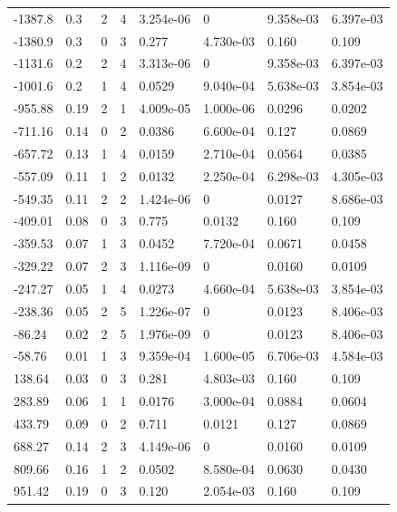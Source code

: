 \documentclass[preview]{standalone}
\begin{document}
{{\begin{tabular}{L{1.2cm}C{1.2cm} C{0.3cm}C{0.5cm} C{1.4cm}C{1.4cm} C{1.4cm}C{1.4cm}}
  -1387.8  &   0.3  & 2     &  4 &  3.254e-06  & 0  & 9.358e-03 &  6.397e-03   \\ 
  -1380.9  &   0.3  & 0     &  3 &  0.277  & 4.730e-03  & 0.160 &  0.109   \\ 
  -1131.6  &   0.2  & 2     &  4 &  3.313e-06  & 0  & 9.358e-03 &  6.397e-03   \\ 
  -1001.6  &   0.2  & 1     &  4 &  0.0529  & 9.040e-04  & 5.638e-03 &  3.854e-03   \\ 
  -955.88  &  0.19  & 2     &  1 &  4.009e-05  & 1.000e-06  & 0.0296 &  0.0202   \\ 
  -711.16  &  0.14  & 0     &  2 &  0.0386  & 6.600e-04  & 0.127 &  0.0869   \\ 
  -657.72  &  0.13  & 1     &  4 &  0.0159  & 2.710e-04  & 0.0564 &  0.0385   \\ 
  -557.09  &  0.11  & 1     &  2 &  0.0132  & 2.250e-04  & 6.298e-03 &  4.305e-03   \\ 
  -549.35  &  0.11  & 2     &  2 &  1.424e-06  & 0  & 0.0127 &  8.686e-03   \\ 
  -409.01  &  0.08  & 0     &  3 &  0.775  & 0.0132  & 0.160 &  0.109   \\ 
  -359.53  &  0.07  & 1     &  3 &  0.0452  & 7.720e-04  & 0.0671 &  0.0458   \\ 
  -329.22  &  0.07  & 2     &  3 &  1.116e-09  & 0  & 0.0160 &  0.0109   \\ 
  -247.27  &  0.05  & 1     &  4 &  0.0273  & 4.660e-04  & 5.638e-03 &  3.854e-03   \\ 
  -238.36  &  0.05  & 2     &  5 &  1.226e-07  & 0  & 0.0123 &  8.406e-03   \\ 
  -86.24  &  0.02  & 2     &  5 &  1.976e-09  & 0  & 0.0123 &  8.406e-03   \\ 
  -58.76  &  0.01  & 1     &  3 &  9.359e-04  & 1.600e-05  & 6.706e-03 &  4.584e-03   \\ 
  138.64  &  0.03  & 0     &  3 &  0.281  & 4.803e-03  & 0.160 &  0.109   \\ 
  283.89  &  0.06  & 1     &  1 &  0.0176  & 3.000e-04  & 0.0884 &  0.0604   \\ 
  433.79  &  0.09  & 0     &  2 &  0.711  & 0.0121  & 0.127 &  0.0869   \\ 
  688.27  &  0.14  & 2     &  3 &  4.149e-06  & 0  & 0.0160 &  0.0109   \\ 
  809.66  &  0.16  & 1     &  2 &  0.0502  & 8.580e-04  & 0.0630 &  0.0430   \\ 
  951.42  &  0.19  & 0     &  3 &  0.120  & 2.054e-03  & 0.160 &  0.109   \\ 

\end{tabular}}}
\end{document}
